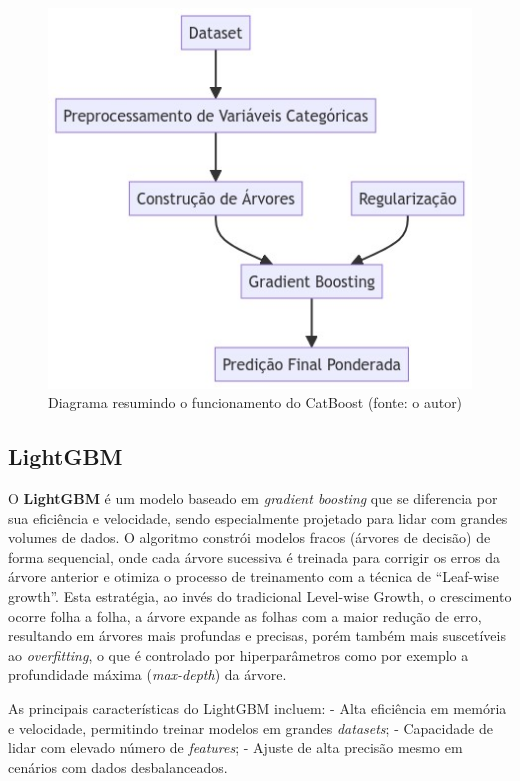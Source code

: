 \begin{figure}[!h]
\centering
\includegraphics[scale=0.75]{Figuras/catboost_diagrama.jpg}
\caption{Diagrama resumindo o funcionamento do CatBoost (fonte: o autor)}
\label{fig:catboost_diagrama}
\end{figure}

\subsection{LightGBM}

O \textbf{LightGBM} é um modelo baseado em \textit{gradient boosting} que se diferencia por sua eficiência e velocidade, sendo especialmente projetado para lidar com grandes volumes de dados. O algoritmo constrói modelos fracos (árvores de decisão) de forma sequencial, onde cada árvore sucessiva é treinada para corrigir os erros da árvore anterior e otimiza o processo de treinamento com a técnica de ``Leaf-wise growth''. Esta estratégia, ao invés do tradicional Level-wise Growth, o crescimento ocorre folha a folha, a árvore expande as folhas com a maior redução de erro, resultando em árvores mais profundas e precisas, porém também mais suscetíveis ao \textit{overfitting}, o que é controlado por hiperparâmetros como por exemplo a profundidade máxima (\textit{max-depth}) da árvore.

As principais características do LightGBM incluem:
- Alta eficiência em memória e velocidade, permitindo treinar modelos em grandes \textit{datasets};
- Capacidade de lidar com elevado número de \textit{features};
- Ajuste de alta precisão mesmo em cenários com dados desbalanceados.

